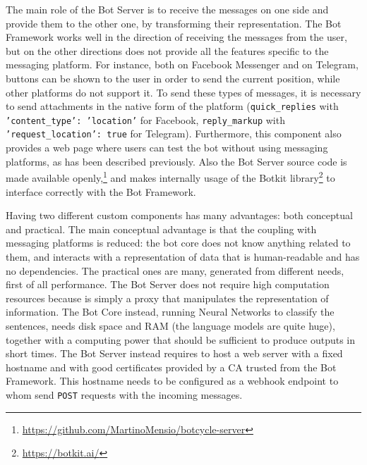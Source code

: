 The main role of the Bot Server is to receive the messages on one side and provide them to the other one, by transforming their representation. The Bot Framework works well in the direction of receiving the messages from the user, but on the other directions does not provide all the features specific to the messaging platform. For instance, both on Facebook Messenger and on Telegram, buttons can be shown to the user in order to send the current position, while other platforms do not support it. To send these types of messages, it is necessary to send attachments in the native form of the platform (\texttt{quick\_replies} with \texttt{'content\_type': 'location'} for Facebook, \texttt{reply\_markup} with \texttt{'request\_location': true} for Telegram). Furthermore, this component also provides a web page where users can test the bot without using messaging platforms, as has been described previously. Also the Bot Server source code is made available openly,\footnote{\url{https://github.com/MartinoMensio/botcycle-server}} and makes internally usage of the Botkit library\footnote{\url{https://botkit.ai/}} to interface correctly with the Bot Framework.

Having two different custom components has many advantages: both conceptual and practical. The main conceptual advantage is that the coupling with messaging platforms is reduced: the bot core does not know anything related to them, and interacts with a representation of data that is human-readable and has no dependencies. The practical ones are many, generated from different needs, first of all performance. The Bot Server does not require high computation resources because is simply a proxy that manipulates the representation of information. The Bot Core instead, running Neural Networks to classify the sentences, needs disk space and RAM (the language models are quite huge), together with a computing power that should be sufficient to produce outputs in short times. The Bot Server instead requires to host a web server with a fixed hostname and with good certificates provided by a CA trusted from the Bot Framework. This hostname needs to be configured as a webhook endpoint to whom send \texttt{POST} requests with the incoming messages.

